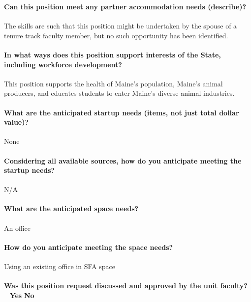 \documentclass[11pt]{article}
\begin{document}
\vfill
\noindent\textbf{\rmfamily Can this position meet any partner accommodation needs (describe)?}\\~\\
The skills are such that this position might be undertaken by the spouse of a tenure track faculty member, but no such opportunity has been identified.\\~\\
\vfill
\noindent\textbf{\rmfamily In what ways does this position support interests of the State, including workforce development?}\\~\\
This position supports the health of Maine's population, Maine's animal producers, and educates students to enter Maine's diverse animal industries.\\~\\
\vfill
\newpage\noindent\textbf{\rmfamily What are the anticipated startup needs (items, not just total dollar value)?}\\~\\
None\\~\\
\vfill
\noindent\textbf{\rmfamily Considering all available sources, how do you anticipate meeting the startup needs?}\\~\\
N/A\\~\\
\vfill
\noindent\textbf{\rmfamily What are the anticipated space needs?}\\~\\
An office\\~\\
\vfill
\noindent\textbf{\rmfamily How do you anticipate meeting the space needs?} \\~\\
Using an existing office in SFA space\\~\\
\vfill
\noindent\textbf{\rmfamily Was this position request discussed and approved by the unit faculty?} \hfill ~ \hfill \textbf{\Large{\HollowBox} \normalsize{Yes}} \hfill \textbf{\Large{\HollowBox} \normalsize{ No}}\\~\\%
\end{document}
